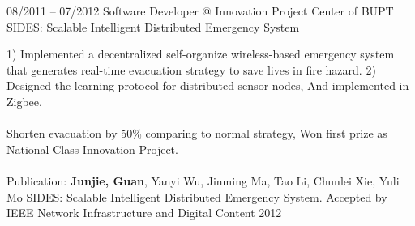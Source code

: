 \documentclass{tccv}
\begin{document}
\begin{eventlist}
     
     
     
     
     
     
    
    
    
    
    
    
    
    
    
    
    
    
    
    
    
   





\item{08/2011 -- 07/2012}
     {Software Developer @ Innovation Project Center of BUPT}
     {SIDES: Scalable Intelligent Distributed Emergency System}
     
     1) Implemented a decentralized self-organize wireless-based emergency system that generates real-time evacuation strategy to save lives in fire hazard. 2) Designed the learning protocol for distributed sensor nodes, And implemented in Zigbee.
\\\\
Shorten evacuation by 50\% comparing to normal strategy, Won first prize as National Class Innovation Project.
\\\\
Publication: \textbf{Junjie, Guan}, Yanyi Wu, Jinming Ma, Tao Li, Chunlei Xie, Yuli Mo SIDES: Scalable Intelligent Distributed Emergency System. Accepted by IEEE Network Infrastructure and Digital Content 2012
     
\end{eventlist}
\end{document}
